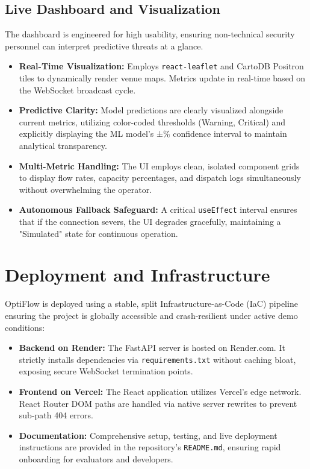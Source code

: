 \documentclass[11pt, a4paper]{article}
\begin{document}
\subsection{Live Dashboard and Visualization}
The dashboard is engineered for high usability, ensuring non-technical security personnel can interpret predictive threats at a glance.
\begin{itemize}[leftmargin=*]
    \item \textbf{Real-Time Visualization:} Employs \texttt{react-leaflet} and CartoDB Positron tiles to dynamically render venue maps. Metrics update in real-time based on the WebSocket broadcast cycle.
    \item \textbf{Predictive Clarity:} Model predictions are clearly visualized alongside current metrics, utilizing color-coded thresholds (Warning, Critical) and explicitly displaying the ML model's ±\% confidence interval to maintain analytical transparency.
    \item \textbf{Multi-Metric Handling:} The UI employs clean, isolated component grids to display flow rates, capacity percentages, and dispatch logs simultaneously without overwhelming the operator.
    \item \textbf{Autonomous Fallback Safeguard:} A critical \texttt{useEffect} interval ensures that if the connection severs, the UI degrades gracefully, maintaining a "Simulated" state for continuous operation.
\end{itemize}

\section{Deployment and Infrastructure}
OptiFlow is deployed using a stable, split Infrastructure-as-Code (IaC) pipeline ensuring the project is globally accessible and crash-resilient under active demo conditions:
\begin{itemize}[leftmargin=*]
    \item \textbf{Backend on Render:} The FastAPI server is hosted on Render.com. It strictly installs dependencies via \texttt{requirements.txt} without caching bloat, exposing secure WebSocket termination points.
    \item \textbf{Frontend on Vercel:} The React application utilizes Vercel's edge network. React Router DOM paths are handled via native server rewrites to prevent sub-path 404 errors.
    \item \textbf{Documentation:} Comprehensive setup, testing, and live deployment instructions are provided in the repository's \texttt{README.md}, ensuring rapid onboarding for evaluators and developers.
\end{itemize}
\end{document}
